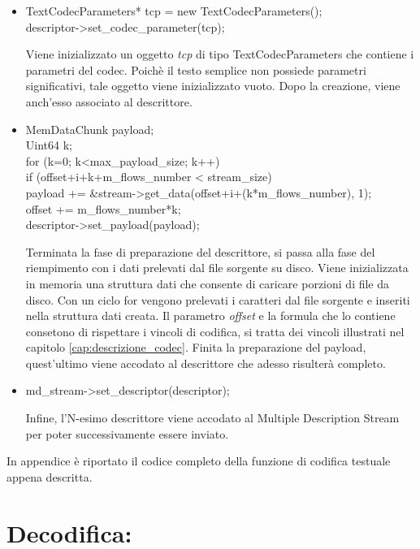 \begin{itemize}
 \item \begin{code}
TextCodecParameters* tcp = new TextCodecParameters();\\
descriptor->set\_codec\_parameter(tcp);\\
\end{code}
Viene inizializzato un oggetto \textit{tcp} di tipo TextCodecParameters che
contiene i parametri del codec. Poichè il testo semplice non possiede parametri significativi, tale oggetto viene inizializzato vuoto. Dopo la creazione, viene anch'esso associato al descrittore.

 \item \begin{code}
MemDataChunk payload;\\
Uint64 k;\\
for (k=0; k<max\_payload\_size; k++)\\
	if (offset+i+k+m\_flows\_number < stream\_size)\\
		payload += \&stream->get\_data(offset+i+(k*m\_flows\_number), 1);\\
offset += m\_flows\_number*k;\\
descriptor->set\_payload(payload);\\
\end{code}
Terminata la fase di preparazione del descrittore, si passa alla fase del
riempimento con i dati prelevati dal file sorgente su disco. Viene inizializzata
in memoria una struttura dati che consente di caricare porzioni di file da disco.
Con un ciclo for vengono prelevati i caratteri dal file sorgente e inseriti nella
struttura dati creata. Il parametro \textit{offset} e la formula che lo contiene
consetono di rispettare i vincoli di codifica, si tratta dei vincoli illustrati
nel capitolo \ref{cap:descrizione_codec}. Finita la preparazione del payload,
quest'ultimo viene accodato al descrittore che adesso risulterà completo.

 \item \begin{code}
md\_stream->set\_descriptor(descriptor);\\
\end{code}
Infine, l'N-esimo descrittore viene accodato al Multiple Description Stream per poter successivamente essere inviato.
\end{itemize}
In appendice è riportato il codice completo della funzione di codifica testuale
appena descritta.

\section{Decodifica:}


